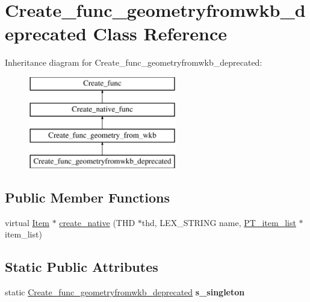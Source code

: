 \hypertarget{classCreate__func__geometryfromwkb__deprecated}{}\section{Create\+\_\+func\+\_\+geometryfromwkb\+\_\+deprecated Class Reference}
\label{classCreate__func__geometryfromwkb__deprecated}
Inheritance diagram for Create\+\_\+func\+\_\+geometryfromwkb\+\_\+deprecated\+:\begin{figure}[H]
\begin{center}
\leavevmode
\includegraphics[height=4.000000cm]{classCreate__func__geometryfromwkb__deprecated}
\end{center}
\end{figure}
\subsection*{Public Member Functions}
\begin{DoxyCompactItemize}
\item 
virtual \mbox{\hyperlink{classItem}{Item}} $\ast$ \mbox{\hyperlink{classCreate__func__geometryfromwkb__deprecated_ad703efb8f0aeacc91ff8d08301a55dd7}{create\+\_\+native}} (T\+HD $\ast$thd, L\+E\+X\+\_\+\+S\+T\+R\+I\+NG name, \mbox{\hyperlink{classPT__item__list}{P\+T\+\_\+item\+\_\+list}} $\ast$item\+\_\+list)
\end{DoxyCompactItemize}
\subsection*{Static Public Attributes}
\begin{DoxyCompactItemize}
\item 
\mbox{\label{classCreate__func__geometryfromwkb__deprecated_a50b5b3d8b071abadddcc1e6782663847}} 
static \mbox{\hyperlink{classCreate__func__geometryfromwkb__deprecated}{Create\+\_\+func\+\_\+geometryfromwkb\+\_\+deprecated}} {\bfseries s\+\_\+singleton}
\end{DoxyCompactItemize}
